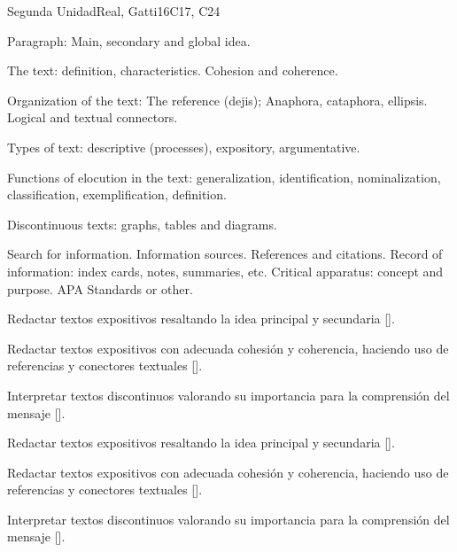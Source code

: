 \begin{syllabus}
\begin{unit}{}{Segunda Unidad}{Real, Gatti}{16}{C17, C24}
\begin{topics}
   \item Paragraph: Main, secondary and global idea.
   \item The text: definition, characteristics. Cohesion and coherence.
   \item Organization of the text: The reference (dejis); Anaphora, cataphora, ellipsis. Logical and textual connectors.
   \item Types of text: descriptive (processes), expository, argumentative.
   \item Functions of elocution in the text: generalization, identification, nominalization, classification, exemplification, definition.
   \item Discontinuous texts: graphs, tables and diagrams.
   \item Search for information. Information sources. References and citations. Record of information: index cards, notes, summaries, etc. Critical apparatus: concept and purpose. APA Standards or other.
\end{topics}
\begin{learningoutcomes}
   \item Redactar textos expositivos resaltando la idea principal y secundaria [\Usage].
   \item Redactar textos expositivos con adecuada cohesión y coherencia, haciendo uso de referencias y conectores textuales [\Usage].
   \item Interpretar textos discontinuos  valorando su importancia para la comprensión del mensaje [\Usage].

   \item Redactar textos expositivos resaltando la idea principal y secundaria [\Usage].
   \item Redactar textos expositivos con adecuada cohesión y coherencia, haciendo uso de referencias y conectores textuales [\Usage].
   \item Interpretar textos discontinuos  valorando su importancia para la comprensión del mensaje [\Usage].
\end{learningoutcomes}
\end{unit}


\end{syllabus}
